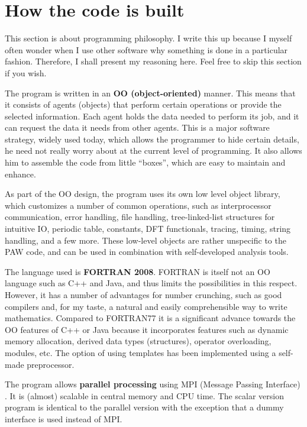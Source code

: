 \documentclass[final,12pt]{article}
\begin{document}
\section{How the code is built}

This section is about programming philosophy.  I write this up because
I myself often wonder when I use other software why something is done
in a particular fashion. Therefore, I shall present my reasoning here.
Feel free to skip this section if you wish.

The program is written in an {\bf OO (object-oriented)} manner. This
means that it consists of agents (objects) that perform certain
operations or provide the selected information. Each agent holds the
data needed to perform its job, and it can request the data it needs
from other agents. This is a major software strategy, widely used
today, which allows the programmer to hide certain details, he need
not really worry about at the current level of programming. It also
allows him to assemble the code from little ``boxes'', which are easy
to maintain and enhance.

As part of the OO design, the program uses its own low level object
library, which customizes a number of common operations, such as
interprocessor communication, error handling, file handling,
tree-linked-list structures for intuitive IO, periodic table,
constants, DFT functionals, tracing, timing, string handling, and a
few more. These low-level objects are rather unspecific to the PAW
code, and can be used in combination with self-developed analysis
tools. 

The language used is {\bf FORTRAN 2008}. FORTRAN is itself not an OO
language such as C++ and Java, and thus limits the possibilities in
this respect. However, it has a number of advantages for number
crunching, such as good compilers and, for my taste, a natural and
easily comprehensible way to write mathematics. Compared to FORTRAN77
it is a significant advance towards the OO features of C++ or Java
because it incorporates features such as dynamic memory allocation,
derived data types (structures), operator overloading, modules, etc.
The option of using templates has been implemented using a self-made
preprocessor.  

The program allows {\bf parallel processing} using MPI (Message
Passing Interface) \cite{mpi}. It is (almost) scalable in central
memory and CPU time.  The scalar version program is identical to the
parallel version with the exception that a dummy interface is used
instead of MPI.
\end{document}
